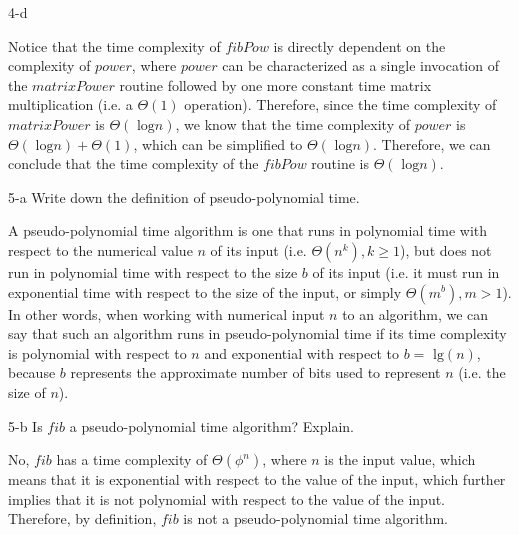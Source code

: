 \documentclass[11pt]{article}
\newcommand{\tlg}{\text{ lg}}
\newcommand{\tlog}{\text{ log}}
\begin{document}
\begin{prob}{4-d}
\end{prob}
\begin{sol}

Notice that the time complexity of $fibPow$ is directly dependent on the complexity of $power$, where $power$ can be characterized as a single invocation of the $matrixPower$ routine followed by one more constant time matrix multiplication (i.e. a $\Theta(1)$ operation). Therefore, since the time complexity of $matrixPower$ is $\Theta(\tlog n)$, we know that the time complexity of $power$ is $\Theta(\tlog n) + \Theta(1)$, which can be simplified to $\Theta(\tlog n)$. Therefore, we can conclude that the time complexity of the $fibPow$ routine is $\Theta(\tlog n)$.
\end{sol}

\begin{prob}{5-a}
Write down the definition of pseudo-polynomial time.
\end{prob}
\begin{sol}
\begin{define}
A pseudo-polynomial time algorithm is one that runs in polynomial time with respect to the numerical value $n$ of its input (i.e. $\Theta(n^{k}), k \geq 1$), but does not run in polynomial time with respect to the size $b$ of its input (i.e. it must run in exponential time with respect to the size of the input, or simply $\Theta(m^{b}), m > 1$). In other words, when working with numerical input $n$ to an algorithm, we can say that such an algorithm runs in pseudo-polynomial time if its time complexity is polynomial with respect to $n$ and exponential with respect to $b = \tlg (n)$, because $b$ represents the approximate number of bits used to represent $n$ (i.e. the size of $n$).
\end{define}
\end{sol}

\begin{prob}{5-b}
Is $fib$ a pseudo-polynomial time algorithm? Explain.
\end{prob}
\begin{sol}

No, $fib$ has a time complexity of $\Theta(\phi^{n})$, where $n$ is the input value, which means that it is exponential with respect to the value of the input, which further implies that it is not polynomial with respect to the value of the input. Therefore, by definition, $fib$ is not a pseudo-polynomial time algorithm.
\end{sol}
\end{document}
